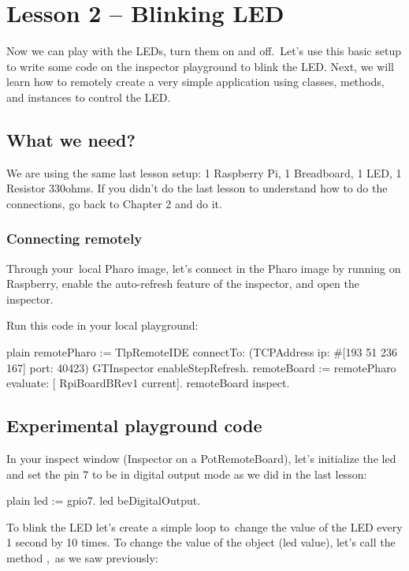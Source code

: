 \documentclass[10pt,twoside,english]{_support/latex/sbabook/sbabook}
\begin{document}
\frontmatter
\pagestyle{plain}

\tableofcontents*
\clearpage\listoffigures

\mainmatter

\chapter{Lesson 2 – Blinking LED }
Now we can play with the LEDs, turn them on and off. Let's use this basic setup to write some code on the inspector playground to blink the LED. Next, we will learn how to remotely create a very simple application using classes, methods, and instances to control the LED.
\section{What we need?}
We are using the same last lesson setup: 1 Raspberry Pi, 1 Breadboard, 1 LED, 1 Resistor 330ohms. If you didn't do the last lesson to understand how to do the connections, go back to Chapter 2 and do it.
\subsection{Connecting remotely}
Through your local Pharo image, let's connect in the Pharo image by running on Raspberry, enable the auto-refresh feature of the inspector, and open the inspector.

Run this code in your local playground:

\begin{displaycode}{plain}
remotePharo := TlpRemoteIDE connectTo: (TCPAddress ip: #[193 51 236 167] port: 40423)
GTInspector enableStepRefresh.
remoteBoard := remotePharo evaluate: [ RpiBoardBRev1 current].
remoteBoard inspect.
\end{displaycode}
\section{Experimental playground code}
In your inspect window (Inspector on a PotRemoteBoard), let's initialize the led and set the pin 7 to be in digital output mode as we did in the last lesson:

\begin{displaycode}{plain}
led := gpio7.
led beDigitalOutput.
\end{displaycode}

To blink the LED let's create a simple loop to change the value of the LED every 1 second by 10 times. To change the value of the object (led value), let's call the method , as we saw previously:
\end{document}
